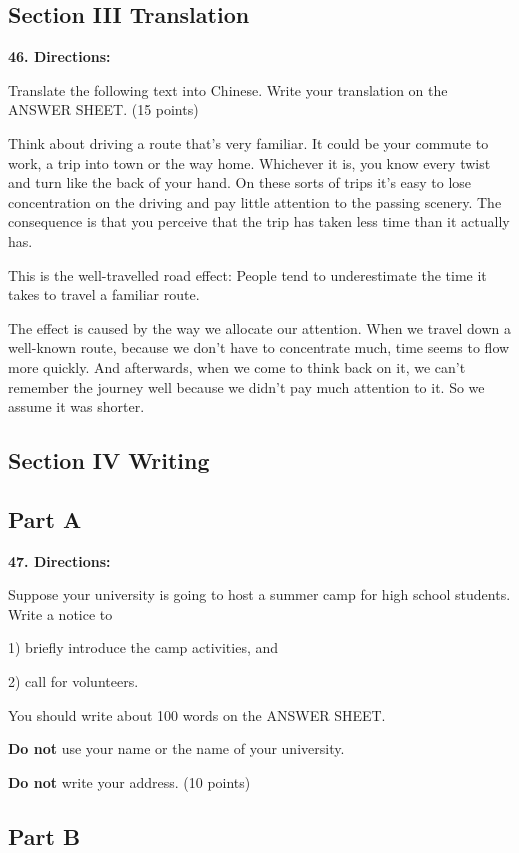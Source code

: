 \documentclass[UTF8,11pt]{ctexart}
\begin{document}
\subsection*{\textbf{Section III Translation}}


\textbf{46. Directions:}


Translate the following text into Chinese. Write your translation on the ANSWER SHEET. (15 points)


Think about driving a route that’s very familiar. It could be your commute to work, a trip into town or the way home. Whichever it is, you know every twist and turn like the back of your hand. On these sorts of trips it’s easy to lose concentration on the driving and pay little attention to the passing scenery. The consequence is that you perceive that the trip has taken less time than it actually has.


This is the well-travelled road effect: People tend to underestimate the time it takes to travel a familiar route.


The effect is caused by the way we allocate our attention. When we travel down a well-known route, because we don’t have to concentrate much, time seems to flow more quickly. And afterwards, when we come to think back on it, we can’t remember the journey well because we didn’t pay much attention to it. So we assume it was shorter.


\subsection*{\textbf{Section IV Writing}}


\subsection*{\textbf{Part A}}


\textbf{47. Directions:}


Suppose your university is going to host a summer camp for high school students. Write a notice to


1) briefly introduce the camp activities, and


2) call for volunteers.


You should write about 100 words on the ANSWER SHEET.


\textbf{Do not} use your name or the name of your university.


\textbf{Do not }write your address. (10 points)


\subsection*{\textbf{Part B}}
\end{document}

